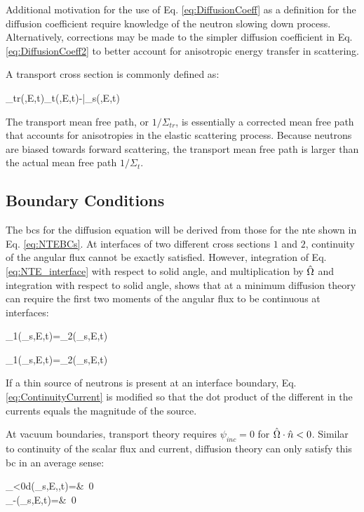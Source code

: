 Additional motivation for the use of Eq. \eqref{eq:DiffusionCoeff} as a definition for the diffusion coefficient require knowledge of the neutron slowing down process. Alternatively, corrections may be made to the simpler diffusion coefficient in Eq. \eqref{eq:DiffusionCoeff2} to better account for anisotropic energy transfer in scattering.

A transport cross section is commonly defined as:

\beq
\label{eq:TransportSigma}
\Sigma_{tr}(,E,t)\equiv\Sigma_t(,E,t)-\bar{\mu}\Sigma_s(,E,t)
\eeq

The transport mean free path, or \(1/\Sigma_{tr}\), is essentially a corrected mean free path that accounts for anisotropies in the elastic scattering process. Because neutrons are biased towards forward scattering, the transport mean free path is larger than the actual mean free path \(1/\Sigma_t\). 

\subsection{Boundary Conditions}

The \glspl{bc} for the diffusion equation will be derived from those for the \gls{nte} shown in Eq. \eqref{eq:NTEBCs}. At interfaces of two different cross sections \(1\) and \(2\), continuity of the angular flux cannot be exactly satisfied. However, integration of Eq. \eqref{eq:NTE_interface} with respect to solid angle, and multiplication by \(\hat{\Omega}\) and integration with respect to solid angle, shows that at a minimum diffusion theory can require the first two moments of the angular flux to be continuous at interfaces:

\beq
\phi_1(_s,E,t)=\phi_2(_s,E,t)
\eeq

\beq
\label{eq:ContinuityCurrent}
_1(_s,E,t)=_2(_s,E,t)
\eeq

If a thin source of neutrons is present at an interface boundary, Eq. \eqref{eq:ContinuityCurrent} is modified so that the dot product of the different in the currents equals the magnitude of the source.

At vacuum boundaries, transport theory requires \(\psi_{inc}=0\) for \(\hat{\Omega}\cdot\hat{n}<0\). Similar to continuity of the scalar flux and current, diffusion theory can only satisfy this \gls{bc} in an average sense:

\beqa
\label{eq:DiffusionVacuumBC}
\int_{\hO\cdot{}<0}d\hO\psi(_s,E,\hO,t)\hO\cdot{}=&\ 0\\
_{-}(_s,E,t)=&\ 0\\
\eeqa

